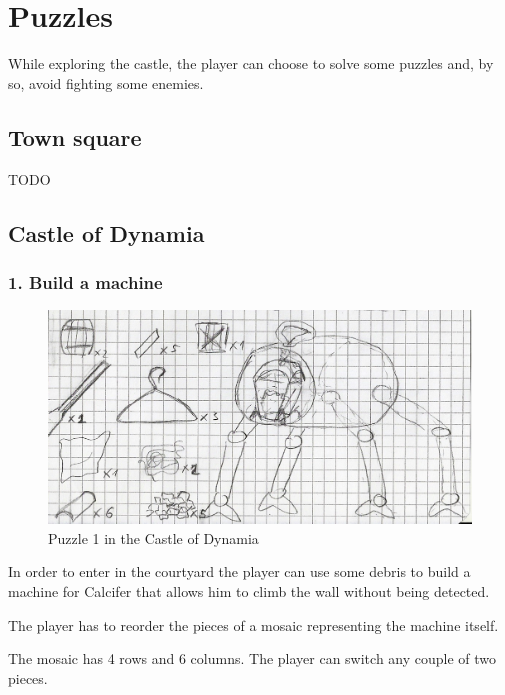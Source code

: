 \section{Puzzles}
While exploring the castle, the player can choose to solve some puzzles and, by so, avoid fighting some enemies.

\subsection{Town square}

TODO

\subsection{Castle of Dynamia}

\subsubsection{1. Build a machine}

\begin{figure}[H]
  \centering
  \includegraphics[width=\textwidth]{Images/Puzzles/castleOfDynamia_1}
  \caption{Puzzle 1 in the Castle of Dynamia}
\end{figure}

In order to enter in the courtyard the player can use some debris to build a machine for Calcifer that allows him to climb the wall without being detected.


The player has to reorder the pieces of a mosaic representing the machine itself.

The mosaic has 4 rows and 6 columns. The player can switch any couple of two pieces.

